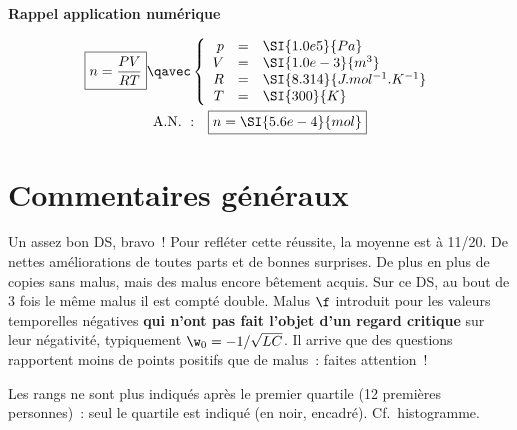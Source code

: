 \documentclass[a4paper, 10pt, final, garamond]{book}
\begin{document}
\begin{brapp}{}
    \begin{center}
        \bfseries Rappel application numérique
    \end{center}
    \begin{minipage}{0.45\linewidth}
        \begin{gather*}
            \boxed{n = \frac{PV}{RT}}
            \qavec
            \left\{
                \begin{array}{rcl}
                    p & = & \SI{1.0e5}{Pa}\\
                    V & = & \SI{1.0e-3}{m^3}\\
                    R & = & \SI{8.314}{J.mol^{-1}.K^{-1}}\\
                    T & = & \SI{300}{K}
                \end{array}
            \right.\\
            \mathrm{A.N.~:}\quad
            \boxed{n = \SI{5.6e-4}{mol}}
        \end{gather*}
    \end{minipage}
    \hfill
\end{brapp}

\section{Commentaires généraux}

Un assez bon DS, bravo~! Pour refléter cette réussite, la moyenne est à 11/20.
De nettes améliorations de toutes parts et de bonnes surprises. De plus en plus
de copies sans malus, mais des malus encore bêtement acquis. Sur ce DS, au bout
de 3 fois le même malus il est compté double. Malus $\f$ introduit pour les
valeurs temporelles négatives \textbf{qui n'ont pas fait l'objet d'un regard
critique} sur leur négativité, typiquement $\w_0 = -1/\sqrt{LC}$. Il arrive que
des questions rapportent moins de points positifs que de malus~: faites
attention~!

Les rangs ne sont plus indiqués après le premier quartile (12 premières
personnes)~: seul le quartile est indiqué (en noir, encadré). Cf.\ histogramme.
\end{document}
